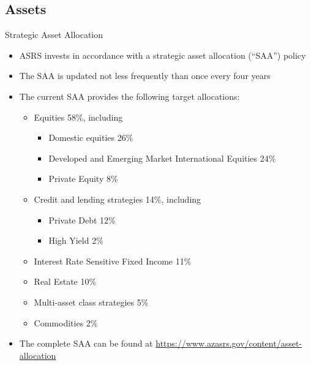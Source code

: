 \documentclass[10pt,english]{beamer}\usepackage[]{graphicx}\usepackage[]{color}
\begin{document}
\subsection{Assets}
\begin{frame}{Strategic Asset Allocation}
\begin{itemize}
\item ASRS invests in accordance with a strategic asset allocation (``SAA'')
policy
\item The SAA is updated not less frequently than once every four years
\item The current SAA provides the following target allocations:
\begin{itemize}
\item Equities 58\%, including
\begin{itemize}
\item Domestic equities 26\%
\item Developed and Emerging Market International Equities 24\%
\item Private Equity 8\%
\end{itemize}
\item Credit and lending strategies 14\%, including
\begin{itemize}
\item Private Debt 12\%
\item High Yield 2\%
\end{itemize}
\item Interest Rate Sensitive Fixed Income 11\%
\item Real Estate 10\%
\item Multi-asset class strategies 5\%
\item Commodities 2\%
\end{itemize}
\item The complete SAA can be found at \href{https://www.azasrs.gov/content/asset-allocation}{https://www.azasrs.gov/content/asset-allocation}
\end{itemize}
\end{frame}
%
\end{document}
